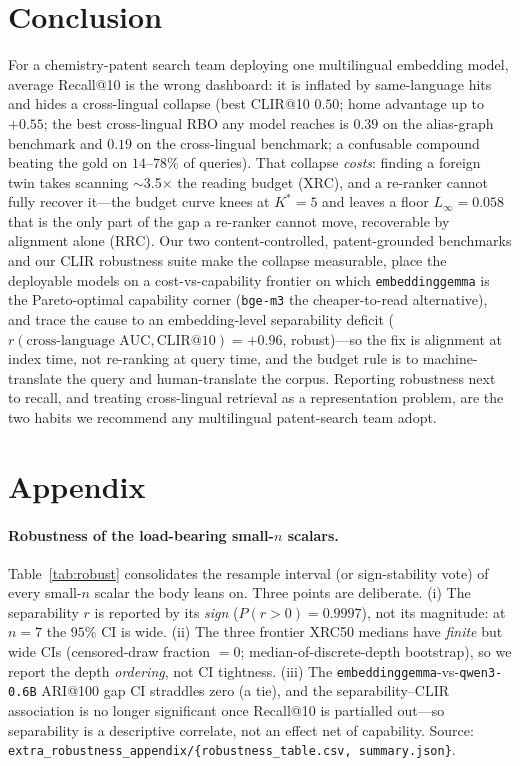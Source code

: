 \documentclass[11pt]{article}
\begin{document}
\section{Conclusion}

For a chemistry-patent search team deploying one multilingual embedding model,
average Recall@10 is the wrong dashboard: it is inflated by same-language hits
and hides a cross-lingual collapse (best CLIR@10 $0.50$; home advantage up to
$+0.55$; the best cross-lingual RBO any model reaches is $0.39$ on the
alias-graph benchmark and $0.19$ on the cross-lingual benchmark; a confusable
compound beating the gold on $14$--$78\%$ of queries). That collapse \emph{costs}:
finding a foreign twin takes scanning $\sim$3.5$\times$ the reading budget (XRC),
and a re-ranker cannot fully recover it---the budget curve knees at $K^{\!*}{=}5$
and leaves a floor $L_\infty=0.058$ that is the only part of the gap a re-ranker
cannot move, recoverable by alignment alone (RRC). Our two
content-controlled, patent-grounded benchmarks and our CLIR robustness suite make
the collapse measurable, place the deployable models on a cost-vs-capability
frontier on which \texttt{embeddinggemma} is the Pareto-optimal capability corner
(\texttt{bge-m3} the cheaper-to-read alternative), and trace the cause to an
embedding-level separability deficit
($r(\text{cross-language AUC},\text{CLIR@10})=+0.96$, robust)---so the fix is
alignment at index time, not re-ranking at query time, and the budget rule is to
machine-translate the query and human-translate the corpus. Reporting robustness
next to recall, and treating cross-lingual retrieval as a representation problem,
are the two habits we recommend any multilingual patent-search team adopt.



\appendix
\section{Appendix}

\paragraph{Robustness of the load-bearing small-$n$ scalars.}
\label{app:robust}
Table~\ref{tab:robust} consolidates the resample interval (or sign-stability
vote) of every small-$n$ scalar the body leans on. Three points are deliberate.
(i) The separability $r$ is reported by its \emph{sign} ($P(r>0)=0.9997$), not
its magnitude: at $n{=}7$ the $95\%$ CI is wide. (ii) The three frontier XRC50
medians have \emph{finite} but wide CIs (censored-draw fraction $=0$;
median-of-discrete-depth bootstrap), so we report the depth \emph{ordering}, not
CI tightness. (iii) The \texttt{embeddinggemma}-vs-\texttt{qwen3-0.6B} ARI@100
gap CI straddles zero (a tie), and the separability--CLIR association is no longer
significant once Recall@10 is partialled out---so separability is a descriptive
correlate, not an effect net of capability. Source:
\texttt{extra\_robustness\_appendix/\{robustness\_table.csv, summary.json\}}.
\end{document}
